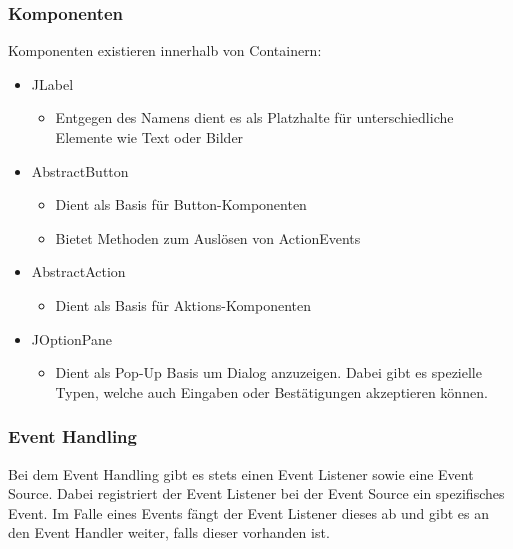 \documentclass{article}
\begin{document}
	\subsubsection{Komponenten}
	Komponenten existieren innerhalb von Containern:
	\begin{itemize}
		\item{JLabel}
		\begin{itemize}
			\item{Entgegen des Namens dient es als Platzhalte für unterschiedliche Elemente wie Text oder Bilder}
		\end{itemize}
		\item{AbstractButton}
		\begin{itemize}
			\item{Dient als Basis für Button-Komponenten}
			\item{Bietet Methoden zum Auslösen von ActionEvents}
		\end{itemize}
		\item{AbstractAction}
		\begin{itemize}
			\item{Dient als Basis für Aktions-Komponenten}
		\end{itemize}
		\item{JOptionPane}
		\begin{itemize}
			\item{Dient als Pop-Up Basis um Dialog anzuzeigen. Dabei gibt es spezielle Typen, welche auch Eingaben oder Bestätigungen akzeptieren können.}
		\end{itemize}
	\end{itemize}
	\subsubsection{Event Handling}
	Bei dem Event Handling gibt es stets einen Event Listener sowie eine Event Source. Dabei registriert der Event Listener bei der Event Source ein spezifisches Event. Im Falle eines Events fängt der Event Listener dieses ab und gibt es an den Event Handler weiter, falls dieser vorhanden ist.
\end{document}

